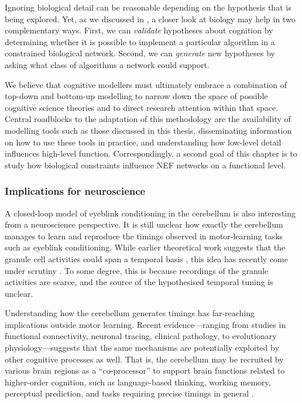 Ignoring biological detail can be reasonable depending on the hypothesis that is being explored. 
Yet, as we discussed in , a closer look at biology may help in two complementary ways.
First, we can \emph{validate} hypotheses about cognition by determining whether it is possible to implement a particular algorithm in a constrained biological network. 
Second, we can \emph{generate} new hypotheses by asking what class of algorithms a network could support.

We believe that cognitive modellers must ultimately embrace a combination of top-down and bottom-up modelling to narrow down the space of possible cognitive science theories and to direct research attention within that space.
Central roadblocks to the adaptation of this methodology are the availability of modelling tools such as those discussed in this thesis, disseminating information on how to use these tools in practice, and understanding how low-level detail influences high-level function.
Correspondingly, a second goal of this chapter is to study how biological constraints influence NEF networks on a functional level.

\subsubsection{Implications for neuroscience}
A closed-loop model of eyeblink conditioning in the cerebellum is also interesting from a neuroscience perspective.
It is still unclear how exactly the cerebellum manages to learn and reproduce the timings observed in motor-learning tasks such as eyeblink conditioning.
While earlier theoretical work suggests that the granule cell activities could span a temporal basis \citep{medina2000computer}, this idea has recently come under scrutiny \citep{johansson2014memory}.
To some degree, this is because recordings of the granule activities are scarce, and the source of the hypothesised temporal tuning is unclear.

Understanding how the cerebellum generates timings has far-reaching implications outside motor learning.
Recent evidence---ranging from studies in functional connectivity, neuronal tracing, clinical pathology, to evolutionary physiology---suggests that the same mechanisms are potentially exploited by other cognitive processes as well.
That is, the cerebellum may be recruited by various brain regions as a \enquote{co-processor} to support brain functions related to higher-order cognition, such as language-based thinking, working memory, perceptual prediction, and tasks requiring precise timings in general \citep{sullivan2010cognitive,
           buckner2013cerebellum,
		   oreilly2008cerebellum,
           e2014metaanalysis,
           sanger2020expansion}.

